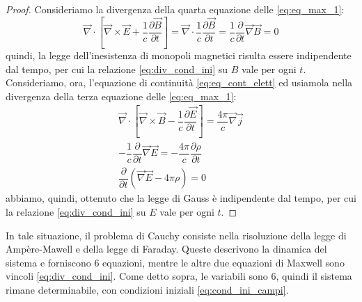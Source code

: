 \begin{proof}
    Consideriamo la divergenza della quarta equazione delle \eqref{eq:eq_max_1}:
    \begin{equation}
      \Vec{\nabla} \cdot \left[\Vec{\nabla}\times\Vec{E}+\dfrac{1}{c}\dfrac{\partial\Vec{B}}{\partial t}\right] =\Vec{\nabla} \cdot \dfrac{1}{c}\dfrac{\partial\Vec{B}}{\partial t}= \dfrac{1}{c}\dfrac{\partial}{\partial t}\Vec{\nabla}\Vec{B}=0
    \end{equation}
    quindi, la legge dell'inesistenza di monopoli magnetici risulta essere indipendente dal tempo, per cui la relazione \eqref{eq:div_cond_ini} su $B$ vale per ogni $t$. 
    Consideriamo, ora, l'equazione di continuità \eqref{eq:eq_cont_elett} ed usiamola nella divergenza della terza equazione delle \eqref{eq:eq_max_1}:
    \begin{equation}
    \begin{gathered}
             \Vec{\nabla} \cdot \left[\Vec{\nabla}\times\Vec{B}-\dfrac{1}{c}\dfrac{\partial\Vec{E}}{\partial t}\right]=\dfrac{4\pi}{c}\Vec{\nabla}\Vec{j}\\
              -\dfrac{1}{c}\dfrac{\partial}{\partial t}\Vec{\nabla}\Vec{E}=-\dfrac{4\pi}{c}\dfrac{\partial\rho}{\partial t}\\
              \dfrac{\partial}{\partial t}\left(\Vec{\nabla}\Vec{E}-4\pi\rho\right)=0
    \end{gathered}
    \end{equation}
   abbiamo, quindi, ottenuto che la legge di Gauss è indipendente dal tempo, per cui la relazione \eqref{eq:div_cond_ini} su $E$ vale per ogni $t$.
\end{proof}
In tale situazione, il problema di Cauchy consiste nella risoluzione della legge di Ampère-Mawell e della legge di Faraday. Queste descrivono la dinamica del sistema e forniscono 6 equazioni, mentre le altre due equazioni di Maxwell sono vincoli \eqref{eq:div_cond_ini}. Come detto sopra, le variabili sono 6, quindi il sistema rimane determinabile, con condizioni iniziali \eqref{eq:cond_ini_campi}.
